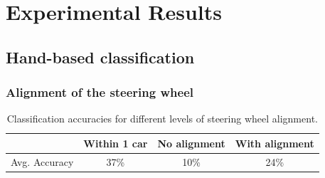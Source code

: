\documentclass[10pt,twocolumn,letterpaper]{article}
\begin{document}







\section{Experimental Results}

\subsection{Hand-based classification}

	\subsubsection{Alignment of the steering wheel}
	\begin{table}
		\begin{tabular}{c|c|c|c}
			& Within 1 car & No alignment & With alignment \\ 
			\hline 
			Avg. Accuracy & 37\% & 10\% & 24\% \\ 
		\end{tabular} 
		\caption{Classification accuracies for different levels of steering wheel alignment.}
		\label{hand_estimation_alignment}
	\end{table}
	
\end{document}
